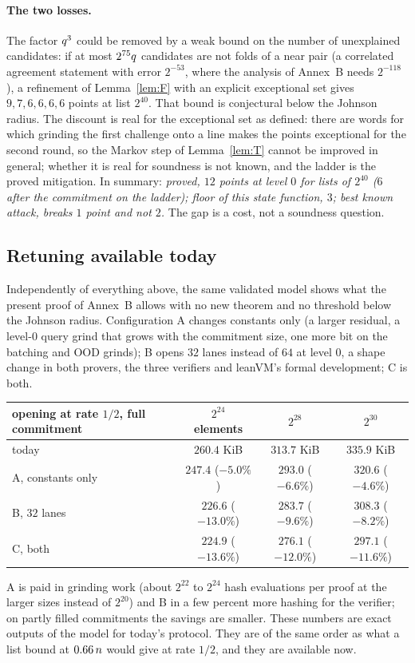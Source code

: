 \paragraph{The two losses.} The factor $q^3$ could be removed by a weak bound on the number of unexplained candidates: if at most $2^{75}q$ candidates are not folds of a near pair (a correlated agreement statement with error $2^{-53}$, where the analysis of Annex~B needs $2^{-118}$), a refinement of Lemma~\ref{lem:F} with an explicit exceptional set gives $9,7,6,6,6,6$ points at list $2^{40}$. That bound is conjectural below the Johnson radius. The discount is real for the exceptional set as defined: there are words for which grinding the first challenge onto a line makes the points exceptional for the second round, so the Markov step of Lemma~\ref{lem:T} cannot be improved in general; whether it is real for soundness is not known, and the ladder is the proved mitigation. In summary: \emph{proved, $12$ points at level $0$ for lists of $2^{40}$ ($6$ after the commitment on the ladder); floor of this state function, $3$; best known attack, breaks $1$ point and not $2$.} The gap is a cost, not a soundness question.

\subsection{Retuning available today}\label{sec:retune}

Independently of everything above, the same validated model shows what the present proof of Annex~B allows with no new theorem and no threshold below the Johnson radius. Configuration A changes constants only (a larger residual, a level-$0$ query grind that grows with the commitment size, one more bit on the batching and OOD grinds); B opens $32$ lanes instead of $64$ at level $0$, a shape change in both provers, the three verifiers and leanVM's formal development; C is both.
\begin{center}
\small
\begin{tabular}{@{}lccc@{}}
\toprule
opening at rate $1/2$, full commitment & $2^{24}$ elements & $2^{28}$ & $2^{30}$\\
\midrule
today & $260.4$ KiB & $313.7$ KiB & $335.9$ KiB\\
A, constants only & $247.4$ ($-5.0\%$) & $293.0$ ($-6.6\%$) & $320.6$ ($-4.6\%$)\\
B, $32$ lanes & $226.6$ ($-13.0\%$) & $283.7$ ($-9.6\%$) & $308.3$ ($-8.2\%$)\\
C, both & $224.9$ ($-13.6\%$) & $276.1$ ($-12.0\%$) & $297.1$ ($-11.6\%$)\\
\bottomrule
\end{tabular}
\end{center}
A is paid in grinding work (about $2^{22}$ to $2^{24}$ hash evaluations per proof at the larger sizes instead of $2^{20}$) and B in a few percent more hashing for the verifier; on partly filled commitments the savings are smaller. These numbers are exact outputs of the model for today's protocol. They are of the same order as what a list bound at $0.66\,n$ would give at rate $1/2$, and they are available now.
